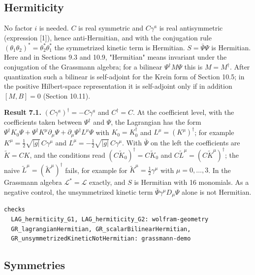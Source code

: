 \documentclass[11pt]{article}
\begin{document}
\subsection{Hermiticity}

No factor $i$ is needed. $C$ is real symmetric and $C\gamma^a$ is real antisymmetric (expression [1]), hence anti-Hermitian, and with the conjugation rule $(\theta_1\theta_2)^\ast=\theta_2^\ast\theta_1^\ast$ the symmetrized kinetic term is Hermitian. $S=\bar\Psi\Psi$ is Hermitian. Here and in Sections 9.3 and 10.9, "Hermitian" means invariant under the conjugation of the Grassmann algebra; for a bilinear $\Psi^\dagger M\Psi$ this is $M=M^\dagger$. After quantization such a bilinear is self-adjoint for the Krein form of Section 10.5; in the positive Hilbert-space representation it is self-adjoint only if in addition $[M,B]=0$ (Section 10.11).

\textbf{Result 7.1.} $(C\gamma^a)^\dagger=-C\gamma^a$ and $C^\dagger=C$. At the coefficient level, with the coefficients taken between $\Psi^\dagger$ and $\Psi$, the Lagrangian has the form $\Psi^\dagger K_0\Psi+\Psi^\dagger K^\mu\partial_\mu\Psi+\partial_\mu\Psi^\dagger L^\mu\Psi$ with $K_0=K_0^\dagger$ and $L^\mu=(K^\mu)^\dagger$; for example $K^\mu=\tfrac12\sqrt{|g|}\,C\gamma^\mu$ and $L^\mu=-\tfrac12\sqrt{|g|}\,C\gamma^\mu$. With $\bar\Psi$ on the left the coefficients are $\tilde K=CK$, and the conditions read $(C\tilde K_0)^\dagger=C\tilde K_0$ and $C\tilde L^\mu=(C\tilde K^\mu)^\dagger$; the naive $\tilde L^\mu=(\tilde K^\mu)^\dagger$ fails, for example for $\tilde K^\mu=\tfrac12\gamma^\mu$ with $\mu=0,\dots,3$. In the Grassmann algebra $\mathcal L^\ast=\mathcal L$ exactly, and $S$ is Hermitian with 16 monomials. As a negative control, the unsymmetrized kinetic term $\bar\Psi\gamma^\mu D_\mu\Psi$ alone is not Hermitian.

\begin{Verbatim}[fontsize=\small]
checks
  LAG_hermiticity_G1, LAG_hermiticity_G2: wolfram-geometry
  GR_lagrangianHermitian, GR_scalarBilinearHermitian,
  GR_unsymmetrizedKineticNotHermitian: grassmann-demo
\end{Verbatim}

\subsection{Symmetries}
\end{document}
